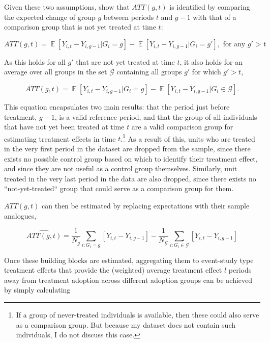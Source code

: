 Given these two assumptions, \citet{callaway2021difference} show that
$ATT(g,t)$ is identified by comparing the expected change of group $g$ between
periods $t$ and $g-1$ with that of a comparison group that is not yet treated
at time $t$:

\begin{equation}
    ATT(g,t) = \mathop{\mathbb{E}}[Y_{i,t} - Y_{i,g-1}|G_i = g] -
    \mathop{\mathbb{E}}[Y_{i,t} - Y_{i,g-1}|G_i = g'], \text{ for any $g'$ > t} 
\end{equation}

As this holds for all $g'$ that are not yet treated at time $t$, it also holds
for an average over all groups in the set $\mathcal{G}$ containing all groups
$g'$ for which $g' > t$,

\begin{equation}
    ATT(g,t) = \mathop{\mathbb{E}}[Y_{i,t} - Y_{i,g-1}|G_i = g] -
    \mathop{\mathbb{E}}[Y_{i,t} - Y_{i,g-1}|G_i \in \mathcal{G}].
\end{equation}

This equation encapsulates two main results: that the period just before
treatment, $g-1$, is a valid reference period, and that the group of all
individuals that have not yet been treated at time $t$ are a valid comparison
group for estimating treatment effects in time $t$.\footnote{If a group of
never-treated individuals is available, then these could also serve as a
comparison group. But because my dataset does not contain such individuals, I
do not discuss this case.} As a result of this, units who are treated in the
very first period in the dataset are dropped from the sample, since there
exists no possible control group based on which to identify their treatment
effect, and since they are not useful as a control group themselves. Similarly,
unit treated in the very last period in the data are also dropped, since there
exists no ``not-yet-treated`` group that could serve as a comparison group for
them.

$ATT(g,t)$ can then be estimated by replacing expectations with their sample
analogues,

\begin{equation}
    \widehat{ATT(g,t)} = \frac{1}{N_g}\sum_{i:G_i=g}[Y_{i,t} - Y_{i, g-1}] -
    \frac{1}{N_\mathcal{G}}\sum_{i:G_i \in \mathcal{G}}[Y_{i,t} - Y_{i, g-1}]
\end{equation}

Once these building blocks are estimated, aggregating them to event-study type treatment effects that provide the (weighted)
average treatment effect $l$ periods away from treatment adoption across
different adoption groups can be achieved by simply calculating

